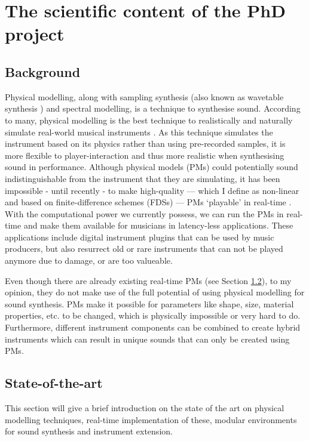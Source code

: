 \section{The scientific content of the PhD project}

\subsection{Background}
Physical modelling, along with sampling synthesis (also known as wavetable synthesis \cite{Smith2010a}) and spectral modelling, is a technique to synthesise sound. According to many, physical modelling is the best technique to realistically and naturally simulate real-world musical instruments \cite{Valimaki2006, Smith2010b, Bilbao2009}. As this technique simulates the instrument based on its physics rather than using pre-recorded samples, it is more flexible to player-interaction and thus more realistic when synthesising sound in performance. Although physical models (PMs) could potentially sound indistinguishable from the instrument that they are simulating, it has been impossible - until recently - to make high-quality — which I define as non-linear and based on finite-difference schemes (FDSs) — PMs ‘playable’ in real-time \cite{Smith2010a}. With the computational power we currently possess, we can run the PMs in real-time and make them available for musicians in latency-less applications. These applications include digital instrument plugins that can be used by music producers, but also resurrect old or rare instruments that can not be played anymore due to damage, or are too valueable. 

Even though there are already existing real-time PMs (see Section \ref{SOTA}), to my opinion, they do not make use of the full potential of using physical modelling for sound synthesis. PMs make it possible for parameters like shape, size, material properties, etc. to be changed, which is physically impossible or very hard to do. Furthermore, different instrument components can be combined to create hybrid instruments which can result in unique sounds that can only be created using PMs.

\subsection{State-of-the-art}\label{SOTA}
This section will give a brief introduction on the state of the art on physical modelling techniques, real-time implementation of these, modular environments for sound synthesis and instrument extension.


